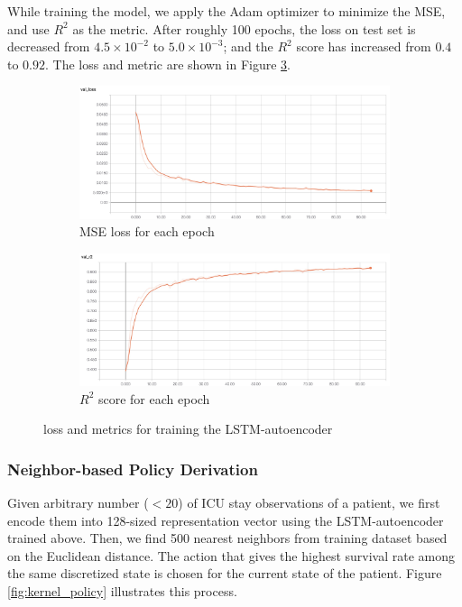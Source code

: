 \documentclass[letterpaper]{article}
\begin{document}
While training the model, we apply the Adam optimizer to minimize the MSE, and use $R^2$ as the metric. After roughly 100 epochs, the loss on test set is decreased from $4.5\times 10^{-2}$ to $5.0 \times 10^{-3}$; and the $R^2$ score has increased from $0.4$ to $0.92$. The loss and metric are shown in Figure \ref{fig:lstm-train}.

\begin{figure}[H]
  \centering
  \begin{subfigure}{0.5\linewidth}
  \centering
  \includegraphics[width=0.9\linewidth]{figures/lstm-loss.jpg}\hfill
  \caption{MSE loss for each epoch}
  \label{fig:lstm-train:a}
  \end{subfigure}%
  \begin{subfigure}{0.5\linewidth}
  \centering
  \includegraphics[width=0.9\linewidth]{figures/lstm-r2.jpg}\hfill
  \caption{$R^2$ score for each epoch}
  \label{fig:lstm-train:b}
  \end{subfigure}
  \caption{loss and metrics for training the LSTM-autoencoder}
  \label{fig:lstm-train}
\end{figure}

\subsubsection{Neighbor-based Policy Derivation}
Given arbitrary number ($<20$) of ICU stay observations of a patient, we first encode them into 128-sized representation vector using the LSTM-autoencoder trained above. Then, we find 500 nearest neighbors from training dataset based on the Euclidean distance. The action that gives the highest survival rate among the same discretized state is chosen for the current state of the patient. Figure \ref{fig:kernel_policy} illustrates this process.
\end{document}
